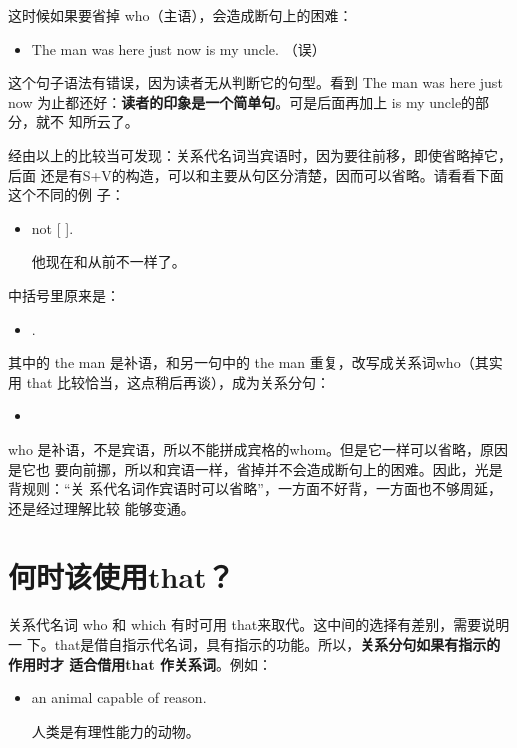 这时候如果要省掉 who（主语），会造成断句上的困难：
\begin{itemize}
\item The man was here just now is my uncle. （误）
\end{itemize}

这个句子语法有错误，因为读者无从判断它的句型。看到 The man was here just now
为止都还好：\textbf{读者的印象是一个简单句}。可是后面再加上 is my uncle的部分，就不
知所云了。

经由以上的比较当可发现：关系代名词当宾语时，因为要往前移，即使省略掉它，后面
还是有S+V的构造，可以和主要从句区分清楚，因而可以省略。请看看下面这个不同的例
子：
\begin{itemize}
\item {}  not  [
  ].

  他现在和从前不一样了。
\end{itemize}

中括号里原来是：
\begin{itemize}
\item {}  .
\end{itemize}
其中的 the man 是补语，和另一句中的 the man 重复，改写成关系词who（其实
用 that 比较恰当，这点稍后再谈），成为关系分句：
\begin{itemize}
\item {}  
\end{itemize}

who 是补语，不是宾语，所以不能拼成宾格的whom。但是它一样可以省略，原因是它也
要向前挪，所以和宾语一样，省掉并不会造成断句上的困难。因此，光是背规则：“关
系代名词作宾语时可以省略”，一方面不好背，一方面也不够周延，还是经过理解比较
能够变通。

\section{何时该使用that？}

关系代名词 who 和 which 有时可用 that来取代。这中间的选择有差别，需要说明一
下。that是借自指示代名词，具有指示的功能。所以，\textbf{关系分句如果有指示的作用时才
适合借用that 作关系词}。例如：

\begin{itemize}
\item {}  an animal  
  capable of reason.

  人类是有理性能力的动物。
\end{itemize}

